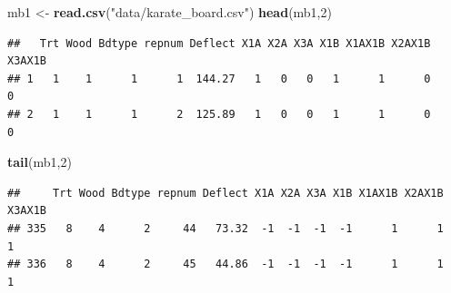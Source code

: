 \documentclass[
]{book}
\newenvironment{Shaded}{\begin{snugshade}}{\end{snugshade}}
\newcommand{\AttributeTok}[1]{\textcolor[rgb]{0.13,0.29,0.53}{#1}}
\newcommand{\DecValTok}[1]{\textcolor[rgb]{0.00,0.00,0.81}{#1}}
\newcommand{\FunctionTok}[1]{\textcolor[rgb]{0.13,0.29,0.53}{\textbf{#1}}}
\newcommand{\NormalTok}[1]{#1}
\newcommand{\OtherTok}[1]{\textcolor[rgb]{0.56,0.35,0.01}{#1}}
\newcommand{\SpecialCharTok}[1]{\textcolor[rgb]{0.81,0.36,0.00}{\textbf{#1}}}
\newcommand{\StringTok}[1]{\textcolor[rgb]{0.31,0.60,0.02}{#1}}
\begin{document}
\begin{Shaded}
\begin{Highlighting}[]
\NormalTok{mb1 }\OtherTok{\textless{}{-}} \FunctionTok{read.csv}\NormalTok{(}\StringTok{"data/karate\_board.csv"}\NormalTok{)}
\FunctionTok{head}\NormalTok{(mb1,}\DecValTok{2}\NormalTok{)}
\end{Highlighting}
\end{Shaded}

\begin{verbatim}
##   Trt Wood Bdtype repnum Deflect X1A X2A X3A X1B X1AX1B X2AX1B X3AX1B
## 1   1    1      1      1  144.27   1   0   0   1      1      0      0
## 2   1    1      1      2  125.89   1   0   0   1      1      0      0
\end{verbatim}

\begin{Shaded}
\begin{Highlighting}[]
\FunctionTok{tail}\NormalTok{(mb1,}\DecValTok{2}\NormalTok{)}
\end{Highlighting}
\end{Shaded}

\begin{verbatim}
##     Trt Wood Bdtype repnum Deflect X1A X2A X3A X1B X1AX1B X2AX1B X3AX1B
## 335   8    4      2     44   73.32  -1  -1  -1  -1      1      1      1
## 336   8    4      2     45   44.86  -1  -1  -1  -1      1      1      1
\end{verbatim}

\begin{Shaded}
\end{Shaded}
\end{document}
